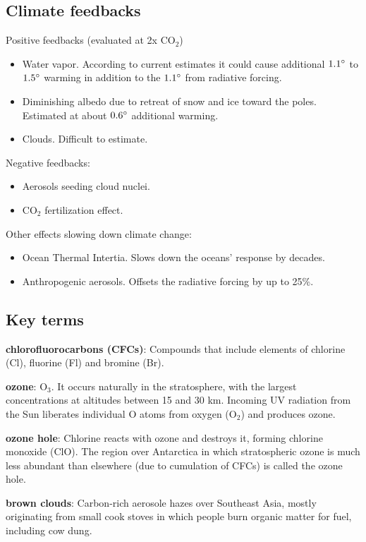 \subsection{Climate feedbacks}
Positive feedbacks (evaluated at 2x CO$_2$)
\begin{itemize}
	\item Water vapor. According to current estimates it could cause
	additional $1.1 \degree$ to $1.5 \degree$ warming in addition to the
	$1.1 \degree$ from radiative forcing.
	\item Diminishing albedo due to retreat of snow and ice toward the
	poles. Estimated at about $0.6 \degree$ additional warming.
	\item Clouds. Difficult to estimate.
\end{itemize}

Negative feedbacks:
\begin{itemize}
	\item Aerosols seeding cloud nuclei.
	\item CO$_2$ fertilization effect.
\end{itemize}

Other effects slowing down climate change:
\begin{itemize}
	\item Ocean Thermal Intertia. Slows down the oceans' response by
	decades.
	\item Anthropogenic aerosols. Offsets the radiative forcing by up to
	25\%.
\end{itemize}

\subsection{Key terms}

\textbf{chlorofluorocarbons (CFCs)}: Compounds that include elements of
chlorine (Cl), fluorine (Fl) and bromine (Br).

\textbf{ozone}: O$_3$. It occurs naturally in the stratosphere, with the
largest concentrations at altitudes between 15 and 30 km. Incoming UV radiation
from the Sun liberates individual O atoms from oxygen (O$_2$) and produces
ozone.

\textbf{ozone hole}: Chlorine reacts with ozone and destroys it, forming
chlorine monoxide (ClO). The region over Antarctica in which stratospheric
ozone is much less abundant than elsewhere (due to cumulation of CFCs) is
called the ozone hole.

\textbf{brown clouds}: Carbon-rich aerosole hazes over Southeast Asia, mostly
originating from  small cook stoves in which people burn organic matter for
fuel, including cow dung.

